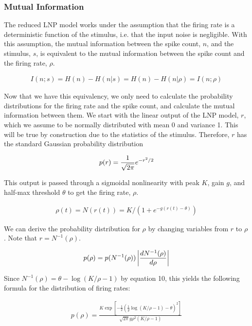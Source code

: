 \documentclass[12pt]{article}
\begin{document}
\subsubsection{Mutual Information}

The reduced LNP model works under the assumption that the firing rate is a deterministic function of the stimulus, i.e. that the input noise is negligible. With this assumption, the mutual information between the spike count, $n$, and the stimulus, $s$, is equivalent to the mutual information between the spike count and the firing rate, $\rho$.

\begin{align}
\displaystyle I(n;s) = H(n)-H(n|s)=H(n)-H(n|\rho)=I(n;\rho) \tag{18}
\end{align}

\noindent Now that we have this equivalency, we only need to calculate the probability distributions for the firing rate and the spike count, and calculate the mutual information between them. We start with the linear output of the LNP model, $r$, which we assume to be normally distributed with mean 0 and variance 1. This will be true by construction due to the statistics of the stimulus. Therefore, $r$ has the standard Gaussian probability distribution

\begin{align}
\displaystyle p(r) = \frac{1}{\sqrt{2\pi}}e^{-r^2/2} \notag
\end{align}

\noindent This output is passed through a sigmoidal nonlinearity with peak $K$, gain $g$, and half-max threshold $\theta$ to get the firing rate, $\rho$.

\begin{align}
\displaystyle \rho(t) = N(r(t)) = K \Big/ \left(1+e^{-g(r(t)-\theta)}\right) \tag{8, 10}
\end{align}

\noindent We can derive the probability distribution for $\rho$ by changing variables from $r$ to $\rho$. Note that $r=N^{-1}(\rho)$.

\begin{align}
\displaystyle p(\rho) = p(N^{-1}(\rho))\left | \frac{dN^{-1}(\rho)}{d\rho} \right | \notag
\end{align}

\noindent Since $\displaystyle N^{-1}(\rho)= \theta - \log(K/\rho-1)$ by equation 10, this yields the following formula for the distribution of firing rates:

\begin{align}
\displaystyle p(\rho) = \frac{K\exp\left[ -\frac{1}{2}\left( \frac{1}{g}\log(K/\rho-1)-\theta\right)^2\right]}{\sqrt{2\pi}g\rho^2(K/\rho-1)} \tag{19}
\end{align}
\end{document}
